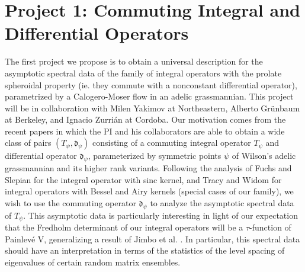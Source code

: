 \documentclass[11pt,letterpaper]{article}
\theoremstyle{definition}
\begin{document}
\section{Project 1: Commuting Integral and Differential Operators}\label{sec:integral differential}
The first project we propose is to obtain a universal description for the asymptotic spectral data of the family of integral operators with the prolate spheroidal property (ie. they commute with a nonconstant differential operator), parametrized by a Calogero-Moser flow in an adelic grassmannian.
This project will be in collaboration with Milen Yakimov at Northeastern, Alberto Gr\"unbaum at Berkeley, and Ignacio Zurri\'an at Cordoba.
Our motivation comes from the recent papers \cite{CGYZ,CGYZ2,CY2019} in which the PI and his collaborators are able to obtain a wide class of pairs $(T_\psi,\mathfrak d_\psi)$ consisting of a commuting integral operator $T_\psi$ and differential operator $\mathfrak d_\psi$, parameterized by symmetric points $\psi$ of Wilson's adelic grassmannian and its higher rank variants.
Following the analysis of Fuchs \cite{Fuchs64} and Slepian \cite{Slepian65} for the integral operator with sinc kernel, and Tracy and Widom \cite{TW1,TW2} for integral operators with Bessel and Airy kernels (special cases of our family), we wish to use the commuting operator $\mathfrak d_\psi$ to analyze the asymptotic spectral data of $T_\psi$.
This asymptotic data is particularly interesting in light of our expectation that the Fredholm determinant of our integral operators will be a $\tau$-function of Painlev\'e V, generalizing a result of Jimbo et al. \cite{JMMS}.
In particular, this spectral data should have an interpretation in terms of the statistics of the level spacing of eigenvalues of certain random matrix ensembles.
\end{document}
